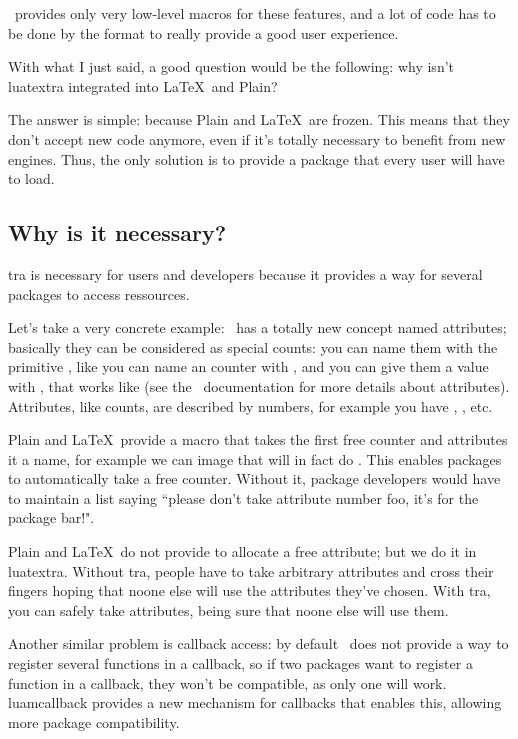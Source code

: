 \documentclass{article}
\begin{document}
\LuaTeX\ provides only very low-level macros for these features, and a lot of code has to be done by the format to really provide a good user experience.

With what I just said, a good question would be the following: why isn't \textsf{luatextra} integrated into \LaTeX\ and Plain?

The answer is simple: because Plain and \LaTeX\ are frozen. This means that they don't accept new code anymore, even if it's totally necessary to benefit from new engines. Thus, the only solution is to provide a package that every user will have to load.

\subsection{Why is it necessary?}

\LuaTeX tra is necessary for users and developers because it provides a way for several packages to access ressources. 

Let's take a very concrete example: \LuaTeX\ has a totally new concept named attributes; basically they can be considered as special counts: you can name them with the primitive \texttt{\string\attribute}, like you can name an counter with \texttt{\string\count}, and you can give them a value with \texttt{\string\attributedef}, that works like \texttt{\string\countdef} (see the \LuaTeX\ documentation for more details about attributes). Attributes, like counts, are described by numbers, for example you have \texttt{\string{}}, \texttt{\string{}}, etc. 

Plain and \LaTeX\ provide a macro \texttt{\string\newcount} that takes the first free counter and attributes it a name, for example we can image that \texttt{\string\newcount\string\foo} will in fact do \texttt{\string{}\string\foo}. This enables packages to automatically take a free counter. Without it, package developers would have to maintain a list saying ``please don't take attribute number foo, it's for the package bar!".

Plain and \LaTeX\ do not provide \texttt{\string\newattribute} to allocate a free attribute; but we do it in \textsf{luatextra}. Without \LuaTeX tra, people have to take arbitrary attributes and cross their fingers hoping that noone else will use the attributes they've chosen. With \LuaTeX tra, you can safely take attributes, being sure that noone else will use them.

Another similar problem is callback access: by default \LuaTeX\ does not provide a way to register several functions in a callback, so if two packages want to register a function in a callback, they won't be compatible, as only one will work. \textsf{luamcallback} provides a new mechanism for callbacks that enables this, allowing more package compatibility.
\end{document}
